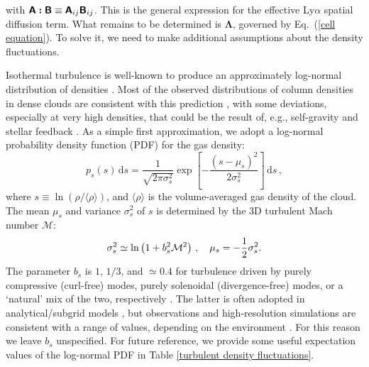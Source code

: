 \documentclass[fleqn,usenatbib]{mnras}
\newcommand\HI{\ion{H}{I}\xspace} %
\begin{document}
with $\textbf{\textsf{A}} \boldsymbol{:} \textbf{\textsf{B}} \equiv \textbf{\textsf{A}}_{ij} \textbf{\textsf{B}}_{ij}$. This is the general expression for the effective Ly$\alpha$ spatial diffusion term. What remains to be determined is $\boldsymbol{\Lambda}$, governed by Eq.~(\ref{cell equation}). To solve it, we need to make additional assumptions about the \HI density fluctuations. 

Isothermal turbulence is well-known to produce an approximately log-normal distribution of densities \citep[e.g.][]{Passot1998, Federrath2010, Krumholz2014review}. Most of the observed distributions of column densities in dense clouds are consistent with this prediction \citep[e.g.][]{Kainulainen2013, Burkhart2015, Schneider2022_turb}, with some deviations, especially at very high densities, that could be the result of, e.g., self-gravity and stellar feedback \citep[][]{Burkhart2017_PLT, Appel2022, Schneider2022_turb}. As a simple first approximation, we adopt a log-normal probability density function (PDF) for the gas density:
\begin{equation}
    p_s(s) \, \textrm{d}s = \dfrac{1}{\sqrt{2 \pi \sigma_s^2}} \exp\left[ - \dfrac{(s - \mu_s)^2}{2 \sigma_s^2} \right] \, \textrm{d}s \, \label{turbulence PDF},
\end{equation}
where $s \equiv \ln(\rho/\langle \rho \rangle)$, and $\langle \rho \rangle$ is the volume-averaged gas density of the cloud. The mean $\mu_s$ and variance $\sigma_s^2$ of $s$ is determined by the 3D turbulent Mach number $\mathcal{M}$:
\begin{equation}
    \sigma_s^2 \simeq \ln\left( 1 + b_s^2 \mathcal{M}^2 \right) \, , \hspace{10 pt} \mu_s = -\dfrac{1}{2} \sigma_s^2 \label{turbulence variance}. 
\end{equation}
The parameter $b_s$ is $1$, $1/3$, and $\simeq 0.4$ for turbulence driven by purely compressive (curl-free) modes, purely solenoidal (divergence-free) modes, or a `natural' mix of the two, respectively \citep[e.g.][]{Federrath2008, Federrath2010, Krumholz2014review}. The latter is often adopted in analytical/subgrid models \citep[e.g.][]{Hopkins2012_GMCs, Faucher2013_feedbackregulated, Kimm2017minihaloes}, but observations and high-resolution simulations are consistent with a range of values, depending on the environment \citep[e.g.][]{Orkisz2017, Menon2020_HIIexpansionturbulence, Sharda2022_turbulenceobs, Gerrard2023}. For this reason we leave $b_s$ unspecified. For future reference, we provide some useful expectation values of the log-normal PDF in Table \ref{turbulent density fluctuations}.
\end{document}
